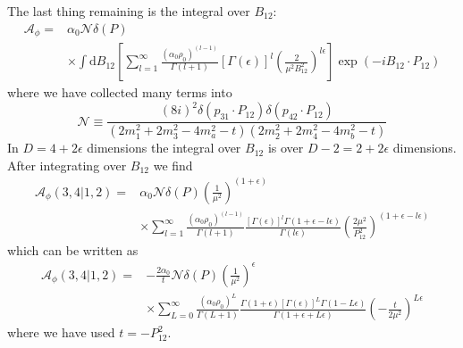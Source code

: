 The last thing remaining is the integral over $B_{12}$:
\begin{equation}
\begin{split}
	\mathcal{A}_{\phi} = {}& \alpha_{0} \mathcal{N} \delta(P) \\
	&\times \int \mathrm{d}B_{12} \left[ \sum_{l = 1}^{\infty} \frac{\left(\alpha_{0} \rho_{0} \right)^{(l - 1)}}{\Gamma(l + 1)} [\Gamma(\epsilon)]^{l} \left(\frac{2}{\mu^{2} B_{12}^{2}} \right)^{l \epsilon} \right] \exp{\left( - i B_{12} \cdot P_{12} \right)}
\end{split} \label{IntB12}
\end{equation}
where we have collected many terms into
\begin{equation}
	\mathcal{N} \equiv \frac{(8i)^{2} \delta(p_{31} \cdot P_{12}) \delta(p_{42} \cdot P_{12})}{\left( 2 m_{1}^{2} + 2 m_{3}^{2} - 4 m_{a}^{2} - t \right) \left( 2 m_{2}^{2} + 2 m_{4}^{2} - 4 m_{b}^{2} - t \right)}
\end{equation}
In $D = 4 + 2 \epsilon$ dimensions the integral over $B_{12}$ is over $D - 2 = 2 + 2 \epsilon$ dimensions. After integrating over $B_{12}$ we find
\begin{equation}
\begin{split}
	\mathcal{A}_{\phi}(3,4|1,2) = {}& \alpha_{0} \mathcal{N} \delta(P) \left(\frac{1}{\mu^{2}} \right)^{(1 + \epsilon)} \\
	&\times \sum_{l = 1}^{\infty} \frac{\left(\alpha_{0} \rho_{0} \right)^{(l - 1)}}{\Gamma(l + 1)} \frac{[\Gamma(\epsilon)]^{l} \Gamma(1 + \epsilon - l \epsilon)}{\Gamma(l \epsilon)} \left(\frac{2\mu^{2}}{P_{12}^{2}} \right)^{(1 + \epsilon - l \epsilon)}
\end{split}
\end{equation}
which can be written as
\begin{equation}
\begin{split}
	\mathcal{A}_{\phi}(3,4|1,2) = {}& {-\frac{2\alpha_{0}}{t}} \mathcal{N} \delta(P) \left( \frac{1}{\mu^{2}} \right)^{\epsilon} \\
	&\times \sum_{L = 0}^{\infty} \frac{\left(\alpha_{0} \rho_{0} \right)^{L}}{\Gamma(L + 1)} \frac{\Gamma(1 + \epsilon) [\Gamma(\epsilon)]^{L} \Gamma(1 - L \epsilon)}{\Gamma(1 + \epsilon + L \epsilon)} \left( -\frac{t}{2 \mu^{2}} \right)^{L \epsilon}
\end{split}
\end{equation}
where we have used $t = - P_{12}^{2}$.

